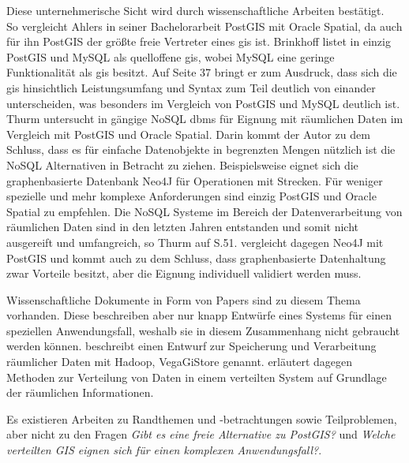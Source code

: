 Diese unternehmerische Sicht wird durch wissenschaftliche Arbeiten bestätigt.\\
So vergleicht Ahlers in seiner Bachelorarbeit \cite{ba:pgvsoracle} PostGIS mit Oracle Spatial, da auch für ihn PostGIS der größte freie Vertreter eines \Gls{gis} ist.
Brinkhoff listet in \cite[S.36]{book:prawirtinf} einzig PostGIS und MySQL als quelloffene \Gls{gis}, wobei MySQL eine geringe Funktionalität als \Gls{gis} besitzt.
Auf Seite 37 bringt er zum Ausdruck, dass sich die \Gls{gis} hinsichtlich Leistungsumfang und Syntax zum Teil deutlich von einander unterscheiden, was besonders im Vergleich von PostGIS und MySQL deutlich ist.
Thurm untersucht in \cite{ba:nosqlfuergeodaten} gängige NoSQL \Gls{dbms} für Eignung mit räumlichen Daten im Vergleich mit PostGIS und Oracle Spatial.
Darin kommt der Autor zu dem Schluss, dass es für einfache Datenobjekte in begrenzten Mengen nützlich ist die NoSQL Alternativen in Betracht zu ziehen.
Beispielsweise eignet sich die graphenbasierte Datenbank Neo4J für Operationen mit Strecken.
Für weniger spezielle und mehr komplexe Anforderungen sind einzig PostGIS und Oracle Spatial zu empfehlen.
Die NoSQL Systeme im Bereich der Datenverarbeitung von räumlichen Daten sind in den letzten Jahren entstanden und somit nicht ausgereift und umfangreich, so Thurm auf S.51.
\cite{ma:neo4j} vergleicht dagegen Neo4J mit PostGIS und kommt auch zu dem Schluss, dass graphenbasierte Datenhaltung zwar Vorteile besitzt, aber die Eignung individuell validiert werden muss.

Wissenschaftliche Dokumente in Form von Papers sind zu diesem Thema vorhanden.
Diese beschreiben aber nur knapp Entwürfe eines Systems für einen speziellen Anwendungsfall, weshalb sie in diesem Zusammenhang nicht gebraucht werden können.
\cite{paper:hdfsspatial} beschreibt einen Entwurf zur Speicherung und Verarbeitung räumlicher Daten mit Hadoop, VegaGiStore genannt.
\cite{paper:spatialdistribution} erläutert dagegen Methoden zur Verteilung von Daten in einem verteilten System auf Grundlage der räumlichen Informationen.

Es existieren Arbeiten zu Randthemen und -betrachtungen sowie Teilproblemen, aber nicht zu den Fragen \textit{Gibt es eine freie Alternative zu PostGIS?} und \textit{Welche verteilten GIS eignen sich für einen komplexen Anwendungsfall?}.


